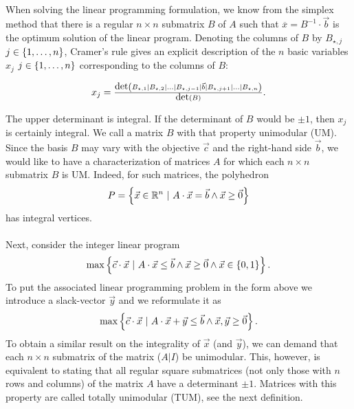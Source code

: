 \documentclass[titlepage]{book}
\theoremstyle{plain}
\theoremstyle{definition}
\theoremstyle{remark}
\begin{document}
\paragraph{}
When solving the linear programming formulation, we know from the simplex method that there is a regular $n\times n$ submatrix $B$ of $A$ such that $\overline{x}=B^{-1}\cdot\vec{b}$ is the optimum solution of the linear program. Denoting the columns of $B$ by $B_{\star,j}$ $j\in\left\{ 1,\ldots,n \right\}$, Cramer's rule gives an explicit description of the $n$ basic variables $x_j$ $j\in\left\{ 1,\ldots,n \right\}$ corresponding to the columns of $B$:

\begin{equation}
x_j=\displaystyle\tfrac{\mbox{det}\left( B_{\star,1}|B_{\star,2}|\ldots|B_{\star,j-1}|\vec{b}|B_{\star,j+1}|\ldots|B_{\star,n} \right)}{\mbox{det}\left( B \right)}.
\end{equation}

The upper determinant is integral. If the determinant of $B$ would be $\pm 1$, then $x_j$ is certainly integral. We call a matrix $B$ with that property unimodular (UM). Since the basis $B$ may vary with the objective $\vec{c}$ and the right-hand side $\vec{b}$, we would like to have a characterization of matrices $A$ for which each $n\times n$ submatrix $B$ is UM. Indeed, for such matrices, the polyhedron
\begin{equation}
P=\left\{ \vec{x}\in\mathbb{R}^n\ |\ A\cdot\vec{x}=\vec{b}\wedge\vec{x}\geq\vec{0} \right\}
\end{equation}
has integral vertices.

\paragraph{}
Next, consider the integer linear program
\begin{equation}
\max\left\{ \vec{c}\cdot\vec{x}\ |\ A\cdot\vec{x}\leq\vec{b}\wedge\vec{x}\geq\vec{0}\wedge\vec{x}\in\left\{ 0,1 \right\} \right\}.
\end{equation}
To put the associated linear programming problem in the form above we introduce a slack-vector $\vec{y}$ and we reformulate it as
\begin{equation}
\max\left\{ \vec{c}\cdot\vec{x}\ |\ A\cdot\vec{x}+\vec{y}\leq\vec{b}\wedge\vec{x},\vec{y}\geq\vec{0} \right\}.
\end{equation}
To obtain a similar result on the integrality of $\vec{x}$ (and $\vec{y}$), we can demand that each $n\times n$ submatrix of the matrix ($A|I$) be unimodular. This, however, is equivalent to stating that all regular square submatrices (not only those with $n$ rows and columns) of the matrix $A$ have a determinant $\pm 1$. Matrices with this property are called totally unimodular (TUM), see the next definition.
\end{document}
